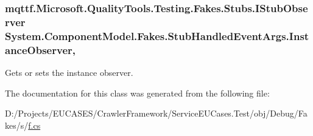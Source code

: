 \hypertarget{class_system_1_1_component_model_1_1_fakes_1_1_stub_handled_event_args_ab062263efa1764ddbdd4bd921f1a7102}{
\subsubsection[{Instance\-Observer}]{\setlength{\rightskip}{0pt plus 5cm}mqttf.\-Microsoft.\-Quality\-Tools.\-Testing.\-Fakes.\-Stubs.\-I\-Stub\-Observer System.\-Component\-Model.\-Fakes.\-Stub\-Handled\-Event\-Args.\-Instance\-Observer\hspace{0.3cm}{\ttfamily [get]}, {\ttfamily [set]}}}\label{class_system_1_1_component_model_1_1_fakes_1_1_stub_handled_event_args_ab062263efa1764ddbdd4bd921f1a7102}


Gets or sets the instance observer.



The documentation for this class was generated from the following file\-:\begin{DoxyCompactItemize}
\item 
D\-:/\-Projects/\-E\-U\-C\-A\-S\-E\-S/\-Crawler\-Framework/\-Service\-E\-U\-Cases.\-Test/obj/\-Debug/\-Fakes/s/\hyperlink{s_2f_8cs}{f.\-cs}\end{DoxyCompactItemize}
